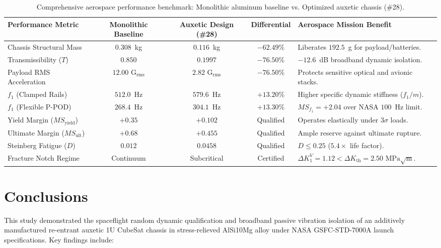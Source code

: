\documentclass[preprint,12pt,3p]{elsarticle}
\begin{document}
\begin{table}[!htbp]
  \centering
  \caption{Comprehensive aerospace performance benchmark: Monolithic aluminum baseline vs. Optimized auxetic chassis (\#28).}
  \label{tab:benchmark}
  \scriptsize
  \begin{tabularx}{\textwidth}{l c c c X}
    \toprule
    \textbf{Performance Metric} & \textbf{Monolithic Baseline} & \textbf{Auxetic Design (\#28)} & \textbf{Differential} & \textbf{Aerospace Mission Benefit} \\
    \midrule
    Chassis Structural Mass & $0.308$~kg & $0.116$~kg & $\mathbf{-62.49\%}$ & Liberates $192.5$~g for payload/batteries. \\
    Transmissibility ($T$) & $0.850$ & $0.1997$ & $\mathbf{-76.50\%}$ & $-12.6$~dB broadband dynamic isolation. \\
    Payload RMS Acceleration & $12.00\text{ G}_{\text{rms}}$ & $2.82\text{ G}_{\text{rms}}$ & $\mathbf{-76.50\%}$ & Protects sensitive optical and avionic stacks. \\
    $f_1$ (Clamped Rails) & $512.0$~Hz & $579.6$~Hz & $\mathbf{+13.20\%}$ & Higher specific dynamic stiffness ($f_1/m$). \\
    $f_1$ (Flexible P-POD) & $268.4$~Hz & $304.1$~Hz & $\mathbf{+13.30\%}$ & $MS_{f_1} = +2.04$ over NASA $100$~Hz limit. \\
    Yield Margin ($MS_{\text{yield}}$) & $+0.35$ & $+0.102$ & Qualified & Operates elastically under $3\sigma$ loads. \\
    Ultimate Margin ($MS_{\text{ult}}$) & $+0.68$ & $+0.455$ & Qualified & Ample reserve against ultimate rupture. \\
    Steinberg Fatigue ($D$) & $0.012$ & $0.0458$ & Qualified & $D \le 0.25$ ($5.4\times$ life factor). \\
    Fracture Notch Regime & Continuum & Subcritical & Certified & $\Delta K_1^V = 1.12 < \Delta K_{\text{th}} = 2.50\text{ MPa}\sqrt{\text{m}}$. \\
    \bottomrule
  \end{tabularx}
\end{table}

\section{Conclusions}
\label{sec:conclusions}

This study demonstrated the spaceflight random dynamic qualification and broadband passive vibration isolation of an additively manufactured re-entrant auxetic 1U CubeSat chassis in stress-relieved AlSi10Mg alloy under NASA GSFC-STD-7000A launch specifications. Key findings include:
\end{document}
